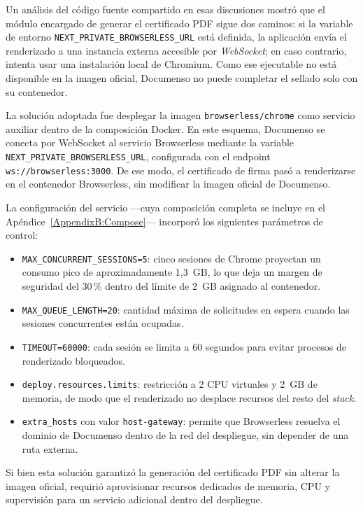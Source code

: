 Un análisis del código fuente compartido en esas discusiones mostró que el módulo encargado de generar el certificado PDF sigue dos caminos: si la variable de entorno \texttt{NEXT\_\allowbreak PRIVATE\_\allowbreak BROWSERLESS\_\allowbreak URL} está definida, la aplicación envía el renderizado a una instancia externa accesible por \textit{WebSocket}; en caso contrario, intenta usar una instalación local de Chromium. Como ese ejecutable no está disponible en la imagen oficial, Documenso no puede completar el sellado solo con su contenedor.

La solución adoptada fue desplegar la imagen \texttt{browserless/chrome} \cite{browserless_chrome} como servicio auxiliar dentro de la composición Docker. En este esquema, Documenso se conecta por WebSocket al servicio Browserless mediante la variable \texttt{NEXT\_PRIVATE\_BROWSERLESS\_URL}, configurada con el endpoint \nolinkurl{ws://browserless:3000}. De ese modo, el certificado de firma pasó a renderizarse en el contenedor Browserless, sin modificar la imagen oficial de Documenso.

La configuración del servicio ---cuya composición completa se incluye en el Apéndice~\ref{AppendixB:Compose}--- incorporó los siguientes parámetros de control:

\begin{itemize}
    \item \texttt{MAX\_CONCURRENT\_SESSIONS=5}: cinco sesiones de Chrome proyectan un consumo pico de aproximadamente 1,3~GB, lo que deja un margen de seguridad del 30\,\% dentro del límite de 2~GB asignado al contenedor.
    \item \nolinkurl{MAX_QUEUE_LENGTH}\texttt{=20}: cantidad máxima de solicitudes en espera cuando las sesiones concurrentes están ocupadas.
    \item \texttt{TIMEOUT=60000}: cada sesión se limita a 60 segundos para evitar procesos de renderizado bloqueados.
    \item \texttt{deploy.resources.limits}: restricción a 2 CPU virtuales y 2~GB de memoria, de modo que el renderizado no desplace recursos del resto del \textit{stack}.
    \item \texttt{extra\_hosts} con valor \texttt{host-gateway}: permite que Browserless resuelva el dominio de Documenso dentro de la red del despliegue, sin depender de una ruta externa.
\end{itemize}

Si bien esta solución garantizó la generación del certificado PDF sin alterar la imagen oficial, requirió aprovisionar recursos dedicados de memoria, CPU y supervisión para un servicio adicional dentro del despliegue.

